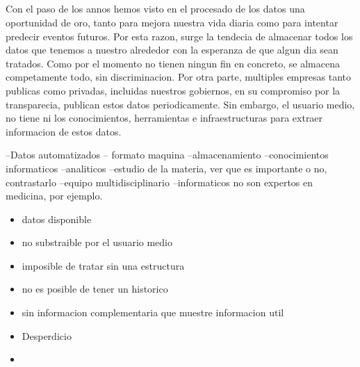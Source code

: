 \subsection*{}
Con el paso de los annos hemos visto en el procesado de los datos una oportunidad de oro, tanto para mejora nuestra vida diaria como para intentar predecir
eventos futuros. Por esta razon, surge la tendecia de almacenar todos los datos que tenemos a nuestro alrededor con la esperanza de que algun dia sean tratados.
Como por el momento no tienen ningun fin en concreto, se almacena competamente todo, sin discriminacion.
Por otra parte, multiples empresas tanto publicas como privadas, incluidas nuestros gobiernos, en su compromiso por la transparecia, publican estos datos periodicamente.
Sin embargo, el usuario medio, no tiene ni los conocimientos, herramientas e infraestructuras para extraer informacion de estos datos.

--Datos automatizados -- formato maquina
--almacenamiento
--conocimientos informaticos
--analiticos
--estudio de la materia, ver que es importante o no, contrastarlo
--equipo multidisciplinario
--informaticos no son expertos en medicina, por ejemplo.
\begin{itemize}

    \item datos disponible
    \item no substraible por el usuario medio
    \item imposible de tratar sin una estructura
    \item no es posible de tener un historico
    \item sin informacion complementaria que muestre informacion util
    \item Desperdicio
    \item \end{itemize}
    